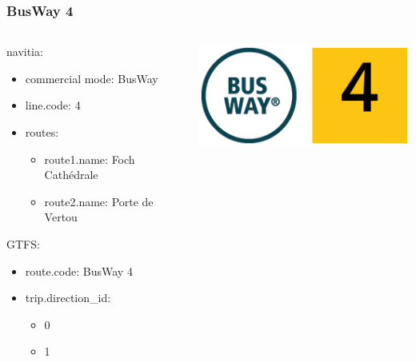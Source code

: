 \documentclass[table]{beamer}
\begin{document}
\begin{frame}
  \frametitle{BusWay 4}
  
  \begin{columns}
    \begin{column}{0.6\linewidth}
      navitia:
      \begin{itemize}
      \item commercial mode: BusWay
      \item line.code: 4
      \item routes:
        \begin{itemize}
        \item route1.name: Foch Cathédrale
        \item route2.name: Porte de Vertou
        \end{itemize}
      \end{itemize}

      GTFS:
      \begin{itemize}
      \item route.code: BusWay 4
      \item trip.direction\_id:
        \begin{itemize}
        \item 0
        \item 1
        \end{itemize}
      \end{itemize}
    \end{column}
    \begin{column}{0.3\linewidth}
      \centering
      \includegraphics[width=0.5\linewidth]{images/busway-logo}


\end{column}
\end{columns}
\end{frame}
\end{document}
